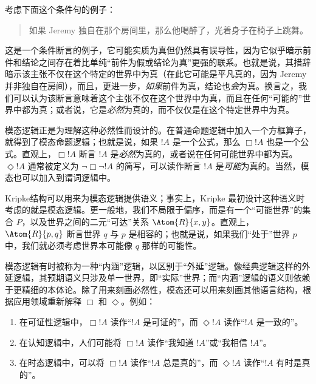 \documentclass[../../../include/open-logic-section]{subfiles}
\begin{document}


考虑下面这个条件句的例子：

\begin{quote}
  如果 Jeremy 独自在那个房间里，那么他喝醉了，光着身子在椅子上跳舞。
\end{quote}

这是一个条件断言的例子，它可能实质为真但仍然具有误导性，因为它似乎暗示前件和结论之间存在着比单纯“前件为假或结论为真”更强的联系。也就是说，其措辞暗示该主张不仅在这个特定的世界中为真（在此它可能是平凡真的，因为 Jeremy 并非独自在房间），而且，更进一步，\emph{如果}前件为真，结论也\emph{会}为真。换言之，我们可以认为该断言意味着这个主张不仅在这个世界中为真，而且在任何“可能的”世界中都为真；或者说，它是\emph{必然}为真的，而不仅仅是在这个特定世界中为真。

模态逻辑正是为理解这种必然性而设计的。在普通命题逻辑中加入一个方框算子，就得到了模态命题逻辑；也就是说，如果 $!A$ 是一个公式，那么 $\Box !A$ 也是一个公式。直观上，$\Box !A$ 断言 $!A$ 是\emph{必然}为真的，或者说在任何可能世界中都为真。$\Diamond !A$ 通常被定义为 $\lnot \Box \lnot !A$ 的简写，可以读作断言 $!A$ 是\emph{可能}为真的。当然，模态也可以加入到谓词逻辑中。

Kripke结构可以用来为模态逻辑提供语义；事实上，Kripke 最初设计这种语义时考虑的就是模态逻辑。更一般地，我们不局限于偏序，而是有一个“可能世界”的集合 $P$，以及世界之间的二元“可达”关系 $\Atom{R}{x,y}$。直观上，$\Atom{R}{p,q}$ 断言世界 $q$ 与 $p$ 是相容的；也就是说，如果我们“处于”世界 $p$ 中，我们就必须考虑世界本可能像 $q$ 那样的可能性。

模态逻辑有时被称为一种“内涵”逻辑，以区别于“外延”逻辑。像经典逻辑这样的外延逻辑，其预期语义只涉及单一世界，即“实际”世界；而“内涵”逻辑的语义则依赖于更精细的本体论。除了用来刻画必然性，模态还可以用来刻画其他语言结构，根据应用领域重新解释 $\Box$ 和 $\Diamond$。例如：

\begin{enumerate}
\item 在可证性逻辑中，$\Box !A$ 读作“$!A$ 是可证的”，而 $\Diamond !A$ 读作“$!A$ 是一致的”。
\item 在认知逻辑中，人们可能将 $\Box !A$ 读作“我知道 $!A$”或“我相信 $!A$”。
\item 在时态逻辑中，可以将 $\Box !A$ 读作“$!A$ 总是真的”，而 $\Diamond !A$ 读作“$!A$ 有时是真的”。
\end{enumerate}
\end{document}
